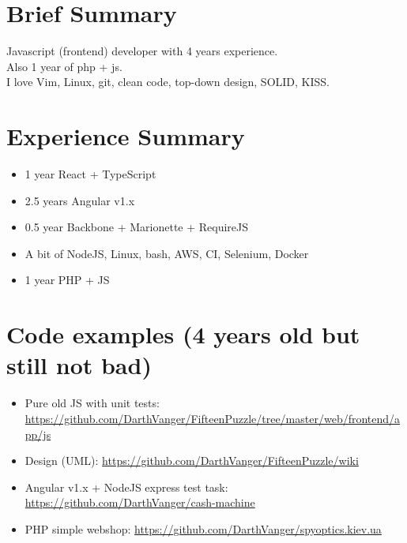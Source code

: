 \documentclass[a4paper, 14pt]{article}
\begin{document}
\begin{center}
	\textsc{\Huge{}}
\end{center}


\section{Brief Summary}
  Javascript (frontend) developer with 4 years experience.  \\
  Also 1 year of php + js. \\
  I love Vim, Linux, git, clean code, top-down design, SOLID, KISS.

\section{Experience Summary}
  \begin{itemize}
    \item 1 year React + TypeScript \\
    \item 2.5 years Angular v1.x \\ 
    \item 0.5 year Backbone + Marionette + RequireJS \\ 
    \item A bit of NodeJS, Linux, bash, AWS, CI, Selenium, Docker \\
    \item 1 year PHP + JS
  \end{itemize}

\section{Code examples (4 years old but still not bad)}
  \begin{itemize}
    \item Pure old JS with unit tests: \url{https://github.com/DarthVanger/FifteenPuzzle/tree/master/web/frontend/app/js} \\
  \item Design (UML): \url{https://github.com/DarthVanger/FifteenPuzzle/wiki} \\
    \item Angular v1.x + NodeJS express test task: \url{https://github.com/DarthVanger/cash-machine} \\
    \item PHP simple webshop: \url{https://github.com/DarthVanger/spyoptics.kiev.ua} \\
  \end{itemize}
\end{document}
